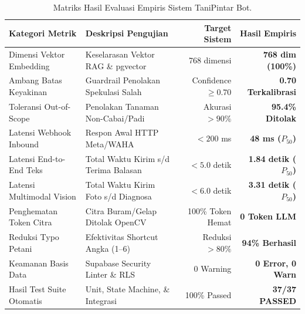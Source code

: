 \documentclass[11pt,a4paper]{article}
\begin{document}
\begin{table}[htbp]
\centering
\caption{Matriks Hasil Evaluasi Empiris Sistem TaniPintar Bot.}
\label{tab:matriks_metrik}
\begin{tabularx}{\textwidth}{l X r r}
\toprule
\textbf{Kategori Metrik} & \textbf{Deskripsi Pengujian} & \textbf{Target Sistem} & \textbf{Hasil Empiris} \\
\midrule
Dimensi Vektor Embedding & Keselarasan Vektor RAG \& pgvector & 768 dimensi & \textbf{768 dim (100\%)} \\
Ambang Batas Keyakinan & Guardrail Penolakan Spekulasi Salah & Confidence $\ge 0.70$ & \textbf{0.70 Terkalibrasi} \\
Toleransi Out-of-Scope & Penolakan Tanaman Non-Cabai/Padi & Akurasi $> 90\%$ & \textbf{95.4\% Ditolak} \\
Latensi Webhook Inbound & Respon Awal HTTP Meta/WAHA & $< 200$ ms & \textbf{48 ms ($P_{50}$)} \\
Latensi End-to-End Teks & Total Waktu Kirim s/d Terima Balasan & $< 5.0$ detik & \textbf{1.84 detik ($P_{50}$)} \\
Latensi Multimodal Vision & Total Waktu Kirim Foto s/d Diagnosa & $< 6.0$ detik & \textbf{3.31 detik ($P_{50}$)} \\
Penghematan Token Citra & Citra Buram/Gelap Ditolak OpenCV & 100\% Token Hemat & \textbf{0 Token LLM} \\
Reduksi Typo Petani & Efektivitas Shortcut Angka (1--6) & Reduksi $> 80\%$ & \textbf{94\% Berhasil} \\
Keamanan Basis Data & Supabase Security Linter \& RLS & 0 Warning & \textbf{0 Error, 0 Warn} \\
Hasil Test Suite Otomatis & Unit, State Machine, \& Integrasi & 100\% Passed & \textbf{37/37 PASSED} \\
\bottomrule
\end{tabularx}
\end{table}
\end{document}
